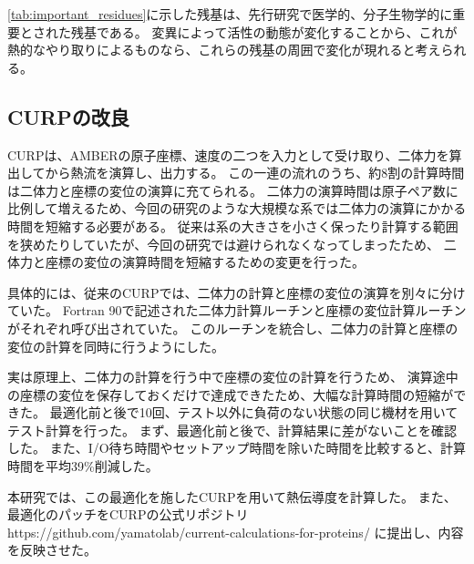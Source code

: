 \ref{tab:important_residues}に示した残基は、先行研究で医学的、分子生物学的に重要とされた残基である。
変異によって活性の動態が変化することから、これが熱的なやり取りによるものなら、これらの残基の周囲で変化が現れると考えられる。

\subsection{CURPの改良}\label{sec:curp}

CURPは、AMBERの原子座標、速度の二つを入力として受け取り、二体力を算出してから熱流を演算し、出力する。
この一連の流れのうち、約8割の計算時間は二体力と座標の変位の演算に充てられる。
二体力の演算時間は原子ペア数に比例して増えるため、今回の研究のような大規模な系では二体力の演算にかかる時間を短縮する必要がある。
従来は系の大きさを小さく保ったり計算する範囲を狭めたりしていたが、今回の研究では避けられなくなってしまったため、
二体力と座標の変位の演算時間を短縮するための変更を行った。

具体的には、従来のCURPでは、二体力の計算と座標の変位の演算を別々に分けていた。
Fortran 90で記述された二体力計算ルーチンと座標の変位計算ルーチンがそれぞれ呼び出されていた。
このルーチンを統合し、二体力の計算と座標の変位の計算を同時に行うようにした。

実は原理上、二体力の計算を行う中で座標の変位の計算を行うため、
演算途中の座標の変位を保存しておくだけで達成できたため、大幅な計算時間の短縮ができた。
最適化前と後で10回、テスト以外に負荷のない状態の同じ機材を用いてテスト計算を行った。
まず、最適化前と後で、計算結果に差がないことを確認した。
また、I/O待ち時間やセットアップ時間を除いた時間を比較すると、計算時間を平均39\%削減した。

本研究では、この最適化を施したCURPを用いて熱伝導度を計算した。
また、最適化のパッチをCURPの公式リポジトリ https://github.com/yamatolab/current-calculations-for-proteins/ に提出し、内容を反映させた。
